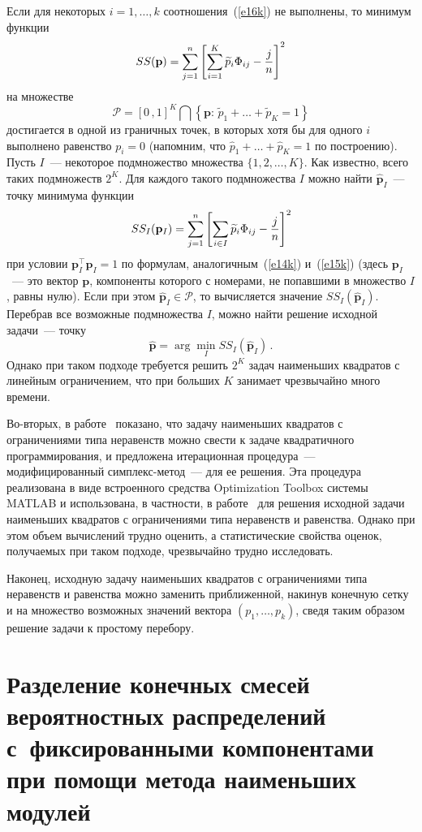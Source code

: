 \begin{multicols}{2}
Если для некоторых $i=1,\ldots,k$ соотношения~(\ref{e16k}) не выполнены,
то минимум функции
$$ SS({\mathbf p})=\sum_{j=1}^n\left [\sum_{i=1}^K\widetilde
p_i\Phi_{ij}-\displaystyle\frac{\displaystyle j\mathstrut}{\displaystyle n\mathstrut}\right ]^2
$$
на множестве
$$
\mathcal{P}=[0\,,1]^K\bigcap \left \{ {\mathbf p}:\, \widetilde
p_1+\ldots+\widetilde p_K=1\right \}
$$
достигается в одной из граничных
точек, в которых хотя бы для одного $i$ выполнено равенство
$p_i=0$ (напомним, что $\widehat p_1+\ldots+\widehat p_K=1$ по
построению). Пусть $I$~--- некоторое подмножество множества
$\{1,2,\ldots,K\}$. Как известно, всего таких подмножеств $2^K$.
Для каждого такого подмножества $I$ можно найти $\widehat{\mathbf
p}_I$~--- точку минимума функции
$$
SS_I({\mathbf
p_I})=\sum_{j=1}^n\left [\sum_{i\in I}\widetilde
p_i\Phi_{ij}-\displaystyle\frac{\displaystyle j\mathstrut}{\displaystyle n\mathstrut}\right ]^2
$$
при условии ${\mathbf
p}_I^{\top}{\mathbf p}_I=1$ по формулам, аналогичным~(\ref{e14k}) и~(\ref{e15k})
(здесь $\mathbf{p}_I$~--- это вектор $\mathbf{p}$, компоненты
которого с номерами, не попавшими в множество $I$, равны нулю).
Если при этом $\widehat{\mathbf p}_I\in {\mathcal P}$, то
вычисляется значение $SS_I(\widehat{\mathbf p}_I)$. Перебрав все
возможные подмножества $I$, можно найти решение исходной задачи~---
точку
$$
\widehat{\mathbf p}=\arg\min_{I}SS_I\left (\widehat{\mathbf
p}_I\right )\,.
$$
Однако при таком подходе требуется решить $2^K$ задач
наименьших квадратов с линейным ограничением, что при больших $K$
занимает чрезвычайно много времени.

Во-вторых, в работе~\cite{5k} показано, что задачу наименьших квадратов
с ограничениями типа неравенств можно свести к задаче
квадратичного\linebreak
программирования, и предложена итерационная
процедура~--- модифицированный симплекс-метод~--- для ее решения.
Эта процедура реализована в виде встроенного средства Optimization
Toolbox системы MATLAB и использована, в частности, в работе~\cite{6k}
для решения исходной задачи наименьших квад\-ра\-тов с ограничениями
типа неравенств и равенства. Однако при этом объем вычислений
трудно оценить, а статистические свойства оценок, получаемых при
таком подходе, чрезвычайно трудно исследовать.

Наконец, исходную задачу наименьших квадратов с ограничениями типа
неравенств и равенства можно заменить приближенной, накинув
конечную сетку и на множество возможных значений вектора
$(p_1,\ldots,p_k)$, сведя таким образом решение задачи к простому
перебору.

\section{Разделение конечных смесей вероятностных распределений
с~фиксированными компонентами при помощи метода наименьших
модулей}


\end{multicols}
